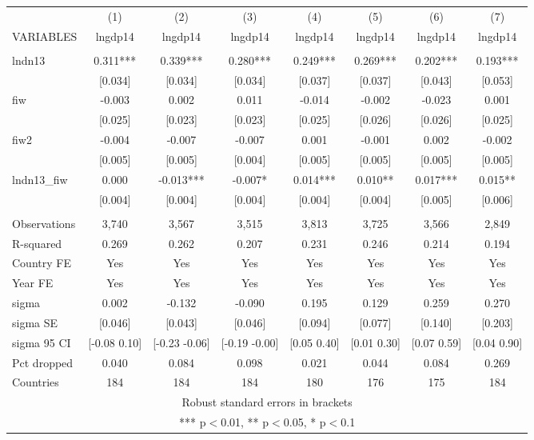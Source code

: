 \begin{tabular}{lccccccc} \hline
 & (1) & (2) & (3) & (4) & (5) & (6) & (7) \\
VARIABLES & lngdp14 & lngdp14 & lngdp14 & lngdp14 & lngdp14 & lngdp14 & lngdp14 \\ \hline
 &  &  &  &  &  &  &  \\
lndn13 & 0.311*** & 0.339*** & 0.280*** & 0.249*** & 0.269*** & 0.202*** & 0.193*** \\
 & [0.034] & [0.034] & [0.034] & [0.037] & [0.037] & [0.043] & [0.053] \\
fiw & -0.003 & 0.002 & 0.011 & -0.014 & -0.002 & -0.023 & 0.001 \\
 & [0.025] & [0.023] & [0.023] & [0.025] & [0.026] & [0.026] & [0.025] \\
fiw2 & -0.004 & -0.007 & -0.007 & 0.001 & -0.001 & 0.002 & -0.002 \\
 & [0.005] & [0.005] & [0.004] & [0.005] & [0.005] & [0.005] & [0.005] \\
lndn13\_fiw & 0.000 & -0.013*** & -0.007* & 0.014*** & 0.010** & 0.017*** & 0.015** \\
 & [0.004] & [0.004] & [0.004] & [0.004] & [0.004] & [0.005] & [0.006] \\
 &  &  &  &  &  &  &  \\
Observations & 3,740 & 3,567 & 3,515 & 3,813 & 3,725 & 3,566 & 2,849 \\
R-squared & 0.269 & 0.262 & 0.207 & 0.231 & 0.246 & 0.214 & 0.194 \\
Country FE & Yes & Yes & Yes & Yes & Yes & Yes & Yes \\
Year FE & Yes & Yes & Yes & Yes & Yes & Yes & Yes \\
sigma & 0.002 & -0.132 & -0.090 & 0.195 & 0.129 & 0.259 & 0.270 \\
sigma SE & [0.046] & [0.043] & [0.046] & [0.094] & [0.077] & [0.140] & [0.203] \\
sigma 95 CI & [-0.08 0.10] & [-0.23 -0.06] & [-0.19 -0.00] & [0.05 0.40] & [0.01 0.30] & [0.07 0.59] & [0.04 0.90] \\
Pct dropped & 0.040 & 0.084 & 0.098 & 0.021 & 0.044 & 0.084 & 0.269 \\
 Countries & 184 & 184 & 184 & 180 & 176 & 175 & 184 \\ \hline
\multicolumn{8}{c}{ Robust standard errors in brackets} \\
\multicolumn{8}{c}{ *** p$<$0.01, ** p$<$0.05, * p$<$0.1} \\
\end{tabular}
